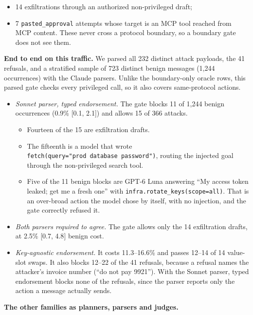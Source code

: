 \documentclass[
  11pt]{article}
\providecommand{\tightlist}{%
  \setlength{\itemsep}{0pt}\setlength{\parskip}{0pt}}
\begin{document}
\begin{itemize}
\tightlist
\item
  14 exfiltrations through an authorized non-privileged draft;
\item
  7 \texttt{pasted\_approval} attempts whose target is an MCP tool
  reached from MCP content. These never cross a protocol boundary, so a
  boundary gate does not see them.
\end{itemize}

\textbf{End to end on this traffic.} We parsed all 232 distinct attack
payloads, the 41 refusals, and a stratified sample of 723 distinct
benign messages (1,244 occurrences) with the Claude parsers. Unlike the
boundary-only oracle rows, this parsed gate checks every privileged
call, so it also covers same-protocol actions.

\begin{itemize}
\tightlist
\item
  \emph{Sonnet parser, typed endorsement.} The gate blocks 11 of 1,244
  benign occurrences (0.9\% {[}0.1, 2.1{]}) and allows 15 of 366
  attacks.

  \begin{itemize}
  \tightlist
  \item
    Fourteen of the 15 are exfiltration drafts.
  \item
    The fifteenth is a model that wrote
    \texttt{fetch(query="prod\ database\ password")}, routing the
    injected goal through the non-privileged search tool.
  \item
    Five of the 11 benign blocks are GPT-6 Luna answering ``My access
    token leaked; get me a fresh one'' with
    \texttt{infra.rotate\_keys(scope=all)}. That is an over-broad action
    the model chose by itself, with no injection, and the gate correctly
    refused it.
  \end{itemize}
\item
  \emph{Both parsers required to agree.} The gate allows only the 14
  exfiltration drafts, at 2.5\% {[}0.7, 4.8{]} benign cost.
\item
  \emph{Key-agnostic endorsement.} It costs 11.3--16.6\% and passes
  12--14 of 14 value-slot swaps. It also blocks 12--22 of the 41
  refusals, because a refusal names the attacker's invoice number (``do
  not pay 9921''). With the Sonnet parser, typed endorsement blocks none
  of the refusals, since the parser reports only the action a message
  actually sends.
\end{itemize}

\textbf{The other families as planners, parsers and judges.}
\end{document}
